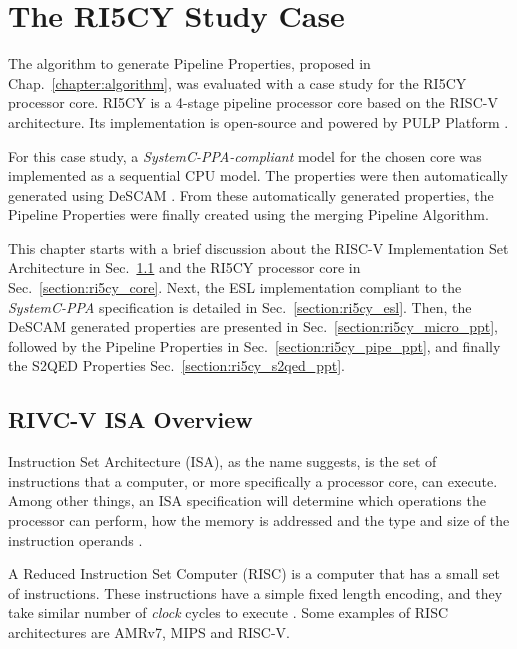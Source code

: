 \chapter{The RI5CY Study Case}

The algorithm to generate Pipeline Properties, proposed in Chap.~\ref{chapter:algorithm},  was evaluated with a case study for the RI5CY processor core. RI5CY is a 4-stage pipeline processor core based on the RISC-V architecture. Its implementation is open-source and powered by PULP Platform \cite{pulp}.

For this case study, a \textit{SystemC-PPA-compliant} \cite{paper-pdd} model for the chosen core was implemented as a sequential CPU model. The properties were then automatically generated using DeSCAM \cite{descam}. From these automatically generated properties, the Pipeline Properties were finally created using the merging Pipeline Algorithm. 

This chapter starts with a brief discussion about the RISC-V Implementation Set Architecture in Sec.~\ref{section:riscv} and the RI5CY processor core in Sec.~\ref{section:ri5cy_core}. Next, the ESL implementation compliant to the \textit{SystemC-PPA} specification is detailed in Sec.~\ref{section:ri5cy_esl}. Then, the DeSCAM generated properties are presented in Sec.~\ref{section:ri5cy_micro_ppt}, followed by the Pipeline Properties in Sec.~\ref{section:ri5cy_pipe_ppt}, and finally the S2QED Properties Sec.~\ref{section:ri5cy_s2qed_ppt}.

\section{RIVC-V ISA Overview}
\label{section:riscv}
Instruction Set Architecture (ISA), as the name suggests, is the set of instructions that a computer, or more specifically a processor core, can execute. Among other things, an ISA specification will determine which operations the processor can perform, how the memory is addressed and the type and size of the instruction operands \cite{book-comp-arch}.

A Reduced Instruction Set Computer (RISC) is a computer that has a small set of instructions. These instructions have a simple fixed length encoding, and they take similar number of \textit{clock} cycles to execute \cite{book-comp-arch}. Some examples of RISC architectures are AMRv7, MIPS and RISC-V.

